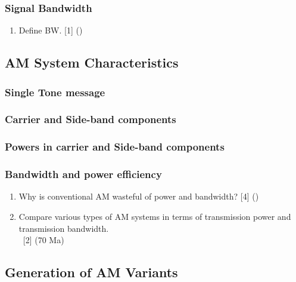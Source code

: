 \documentclass[12pt]{article}
\newcommand{\enter}{\\\textcolor{white}{1}}
\begin{document}
    \subsubsection{Signal Bandwidth}
    	  \begin{enumerate}
        \item Define BW. \hfill [1] ()
    	  \end{enumerate}

  \subsection{AM System Characteristics}
    \subsubsection{Single Tone message}
    \subsubsection{Carrier and Side-band components}
    \subsubsection{Powers in carrier and Side-band components}
    \subsubsection{Bandwidth and power efficiency}
      \begin{enumerate}
        \item Why is conventional AM wasteful of power and bandwidth? \hfill [4] ()

        \item Compare various types of AM systems in terms of transmission power and transmission bandwidth.
        \enter\hfill [2] (70 Ma)
      \end{enumerate}

  \subsection{Generation of AM Variants}
\end{document}
